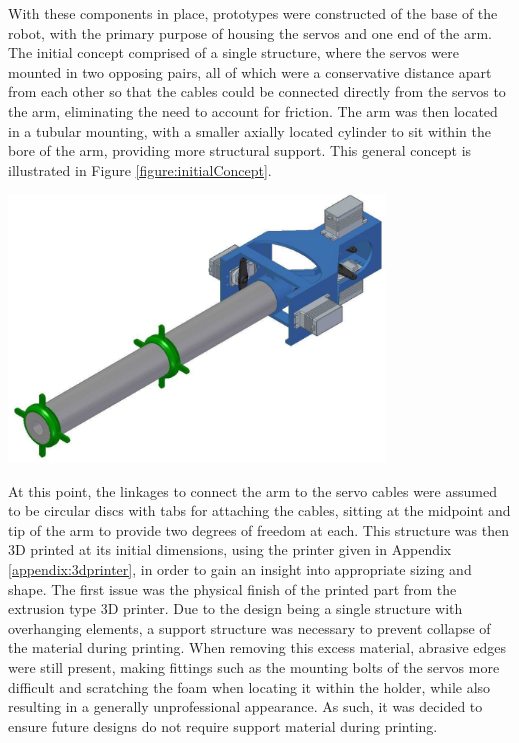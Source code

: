 \documentclass[11pt]{article}
\begin{document}
With these components in place, prototypes were constructed of the base of the robot, with the primary purpose of housing the servos and one end of the arm. The initial concept comprised of a single structure, where the servos were mounted in two opposing pairs, all of which were a conservative distance apart from each other so that the cables could be connected directly from the servos to the arm, eliminating the need to account for friction. The arm was then located in a tubular mounting, with a smaller axially located cylinder to sit within the bore of the arm, providing more structural support. This general concept is illustrated in Figure \ref{figure:initialConcept}.

\begin{center}
\includegraphics[width=0.75\textwidth]{images/initialConcept.png}
\label{figure:initialConcept}
\end{center}

At this point, the linkages to connect the arm to the servo cables were assumed to be circular discs with tabs for attaching the cables, sitting at the midpoint and tip of the arm to provide two degrees of freedom at each. This structure was then 3D printed at its initial dimensions, using the printer given in Appendix \ref{appendix:3dprinter}, in order to gain an insight into appropriate sizing and shape. The first issue was the physical finish of the printed part from the extrusion type 3D printer. Due to the design being a single structure with overhanging elements, a support structure was necessary to prevent collapse of the material during printing. When removing this excess material, abrasive edges were still present, making fittings such as the mounting bolts of the servos more difficult and scratching the foam when locating it within the holder, while also resulting in a generally unprofessional appearance. As such, it was decided to ensure future designs do not require support material during printing. 
\end{document}

